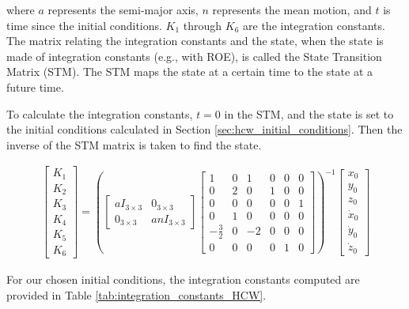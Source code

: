 where $a$ represents the semi-major axis, $n$ represents the mean motion, and $t$ is time since the initial conditions. $K_1$ through $K_6$ are the integration constants. The matrix relating the integration constants and the state, when the state is made of integration constants (e.g., with ROE), is called the State Transition Matrix (STM). The STM maps the state at a certain time to the state at a future time. 

To calculate the integration constants, $t = 0$ in the STM, and the state is set to the initial conditions calculated in Section \ref{sec:hcw_initial_conditions}. Then the inverse of the STM matrix is taken to find the state.

\begin{align}
    \begin{bmatrix}
K_1 \\ K_2 \\ K_3 \\ K_4 \\ K_5 \\ K_6
\end{bmatrix} = \left(\begin{bmatrix}
a I_{3 \times 3} & 0_{3 \times 3} \\
0_{3 \times 3} & a n I_{3 \times 3}
\end{bmatrix}
\begin{bmatrix}
1 & 0 & 1 & 0 & 0 & 0 \\
0 & 2 & 0 & 1 & 0 & 0 \\
0 & 0 & 0 & 0 & 0 & 1 \\
0 & 1 & 0 & 0 & 0 & 0 \\
-\frac{3}{2} & 0 & -2 & 0 & 0 & 0 \\
0 & 0 & 0 & 0 & 1 & 0
\end{bmatrix}\right)^{-1} \begin{bmatrix}
x_0 \\ y_0 \\ z_0 \\ \dot{x}_0 \\ \dot{y}_0 \\ \dot{z}_0
\end{bmatrix}
\end{align}

For our chosen initial conditions, the integration constants computed are provided in Table \ref{tab:integration_constants_HCW}.

